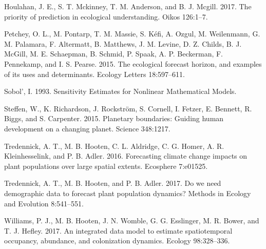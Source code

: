 \documentclass[12pt,]{article}
\begin{document}
\leavevmode\hypertarget{ref-Houlahan2017}{}%
Houlahan, J. E., S. T. Mckinney, T. M. Anderson, and B. J. Mcgill. 2017.
The priority of prediction in ecological understanding. Oikos 126:1--7.

\leavevmode\hypertarget{ref-Petchey2015}{}%
Petchey, O. L., M. Pontarp, T. M. Massie, S. Kéfi, A. Ozgul, M.
Weilenmann, G. M. Palamara, F. Altermatt, B. Matthews, J. M. Levine, D.
Z. Childs, B. J. McGill, M. E. Schaepman, B. Schmid, P. Spaak, A. P.
Beckerman, F. Pennekamp, and I. S. Pearse. 2015. The ecological forecast
horizon, and examples of its uses and determinants. Ecology Letters
18:597--611.

\leavevmode\hypertarget{ref-Sobol1993}{}%
Sobol', I. 1993. Sensitivity Estimates for Nonlinear Mathematical
Models.

\leavevmode\hypertarget{ref-Steffen2015}{}%
Steffen, W., K. Richardson, J. Rockström, S. Cornell, I. Fetzer, E.
Bennett, R. Biggs, and S. Carpenter. 2015. Planetary boundaries: Guiding
human development on a changing planet. Science 348:1217.

\leavevmode\hypertarget{ref-Tredennick2016Ecos}{}%
Tredennick, A. T., M. B. Hooten, C. L. Aldridge, C. G. Homer, A. R.
Kleinhesselink, and P. B. Adler. 2016. Forecasting climate change
impacts on plant populations over large spatial extents. Ecosphere
7:e01525.

\leavevmode\hypertarget{ref-Tredennick2017a}{}%
Tredennick, A. T., M. B. Hooten, and P. B. Adler. 2017. Do we need
demographic data to forecast plant population dynamics? Methods in
Ecology and Evolution 8:541--551.

\leavevmode\hypertarget{ref-Williams2017a}{}%
Williams, P. J., M. B. Hooten, J. N. Womble, G. G. Esslinger, M. R.
Bower, and T. J. Hefley. 2017. An integrated data model to estimate
spatiotemporal occupancy, abundance, and colonization dynamics. Ecology
98:328--336.
\end{document}
